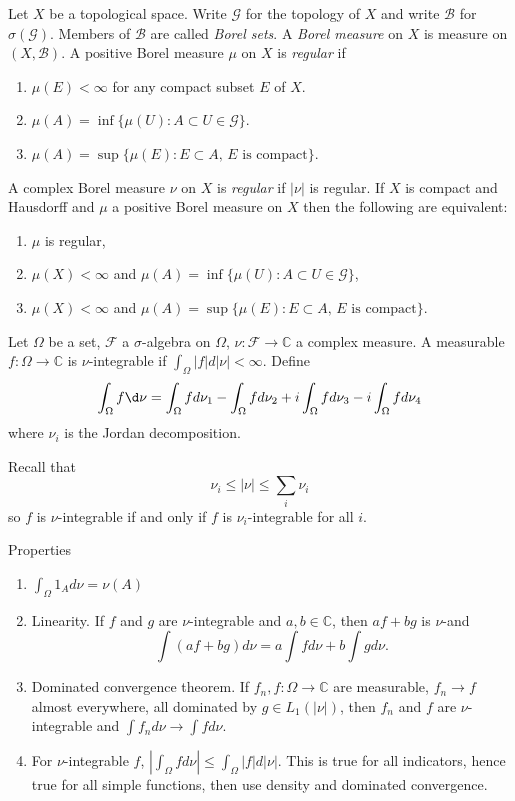 Let $X$ be a topological space.
Write $\mathcal{G}$ for the topology of $X$
and write $\mathcal{B}$ for $\sigma(\mathcal{G})$.
Members of $\mathcal{B}$ are called \emph{Borel sets}.
A \emph{Borel measure} on $X$ is measure on $(X,\mathcal{B})$.
A positive Borel measure $\mu$ on $X$ is \emph{regular} if
\begin{enumerate}
  \item $\mu(E)<\infty$ for any compact subset $E$ of $X$.
  \item $\mu(A)=\inf \{\mu (U):A\subset U\in \mathcal{G}\}$.
  \item $\mu(A)=\sup \{\mu (E):\text{$E\subset A$, $E$ is compact}\}$.
\end{enumerate}
A complex Borel measure $\nu$ on $X$ is \emph{regular}
 if $|\nu| $ is regular.
 If $X$ is compact and Hausdorff and $\mu$ a positive Borel measure on $X$ then the following
 are equivalent:
 \begin{enumerate}
   \item $\mu$ is regular,
   \item $\mu(X)<\infty$ and $\mu(A)=\inf \{\mu (U):A\subset U\in \mathcal{G}\}$,
   \item $\mu(X)<\infty$ and $\mu(A)=\sup \{\mu (E):\text{$E\subset A$, $E$ is compact}\}$.
 \end{enumerate}
 Let $\Omega$ be a set, $\mathcal{F}$ a $\sigma$-algebra on $\Omega$, $\nu:\mathcal{F}\to\mathbb{C}$
 a complex measure.
 A measurable $f:\Omega\to\mathbb{C}$ is $\nu$-integrable if $\int_\Omega|f|d|\nu|<\infty$.
 Define
 $$\int_\Omega f\d\nu=\int_\Omega f d\nu_1-\int_\Omega f d\nu_2+i\int_\Omega f d\nu_3-i\int_\Omega f d\nu_4$$
 where $\nu_i$ is the Jordan decomposition.

 Recall that
 $$\nu_i\leq |\nu|\leq \sum_i\nu_i$$
 so $f$ is $\nu$-integrable if and only if $f$ is $\nu_i$-integrable for all $i$.

 Properties
\begin{enumerate}
  \item $\int_\Omega 1_A d\nu=\nu(A)$
  \item Linearity.
  If $f$ and $g$ are $\nu$-integrable and $a,b\in \mathbb{C}$,
  then $af+bg$ is $\nu$-\integrable and
  $$\int(af+bg)d\nu=a\int fd\nu+b\int gd\nu.$$
  \item Dominated convergence theorem.
  If $f_n,f:\Omega\to \mathbb{C}$ are measurable,
  $f_n\to f$ almost everywhere,
  all dominated by $g\in L_1(|\nu|)$,
  then $f_n$ and $f$ are $\nu$-integrable
  and $\int f_nd\nu\to\int fd\nu$.
  \item For $\nu$-integrable $f$, $|\int_\Omega f d\nu|\leq \int_\Omega |f|d|\nu|$.
  This is true for all indicators, hence true for all simple functions, then use density and dominated convergence.
\end{enumerate}

